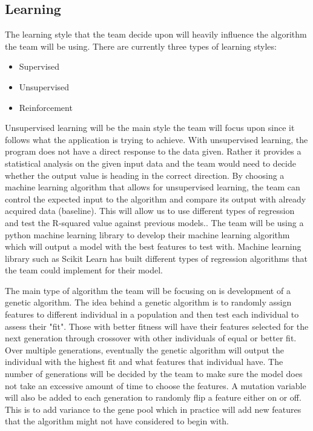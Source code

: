 \documentclass[onecolumn, draftclsnofoot,10pt, compsoc]{IEEEtran}
\begin{document}
\begin{singlespace}
\subsection{Learning}
The learning style that the team decide upon will heavily influence the algorithm the team will be using.
There are currently three types of learning styles:
\begin{itemize}
	\item Supervised
	\item Unsupervised
	\item Reinforcement
\end{itemize}
Unsupervised learning will be the main style the team will focus upon since it follows what the application is trying to achieve.
With unsupervised learning, the program does not have a direct response to the data given.
Rather it provides a statistical analysis on the given input data and the team would need to decide whether the output value is heading in the correct direction.
By choosing a machine learning algorithm that allows for unsupervised learning, the team can control the expected input to the algorithm and compare its output with already acquired data (baseline).
This will allow us to use different types of regression and test the R-squared value against previous models.\cite{supervised}.
The team will be using a python machine learning library to develop their machine learning algorithm which will output a model with the best features to test with.
Machine learning library such as Scikit Learn has built different types of regression algorithms that the team could implement for their model.

The main type of algorithm the team will be focusing on is development of a genetic algorithm.
The idea behind a genetic algorithm is to randomly assign features to different individual in a population and then test each individual to assess their "fit". 
Those with better fitness will have their features selected for the next generation through crossover with other individuals of equal or better fit.
Over multiple generations, eventually the genetic algorithm will output the individual with the highest fit and what features that individual have.
The number of generations will be decided by the team to make sure the model does not take an excessive amount of time to choose the features.
A mutation variable will also be added to each generation to randomly flip a feature either on or off. 
This is to add variance to the gene pool which in practice will add new features that the algorithm might not have considered to begin with.

\end{singlespace}
\end{document}
